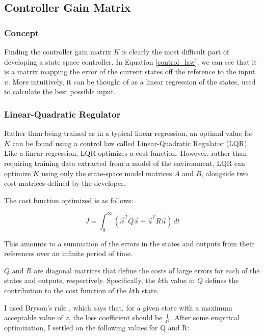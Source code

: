 \documentclass[11pt]{article}
\begin{document}
\subsection{Controller Gain Matrix}

\subsubsection{Concept}

Finding the controller gain matrix $K$ is clearly the most difficult part of developing a state space controller. In Equation \ref{control_law}, we can see that it is a matrix mapping the error of the current states off the reference to the input $u$. More intuitively, it can be thought of as a linear regression of the states, used to calculate the best possible input.

\subsubsection{Linear-Quadratic Regulator}

Rather than being trained as in a typical linear regression, an optimal value for $K$ can be found using a control law called Linear-Quadratic Regulator (LQR). Like a linear regression, LQR optimizes a cost function. However, rather than requiring training data extracted from a model of the environment, LQR can optimize $K$ using only the state-space model matrices $A$ and $B$, alongside two cost matrices defined by the developer.

The cost function optimized is as follows:

\begin{equation}
    J = \int _0 ^{\infty} \! (\vec{x} ^T Q \vec{x} + \vec{u} ^T R \vec{u}) \, dt
\end{equation}

This amounts to a summation of the errors in the states and outputs from their references over an infinite period of time.

$Q$ and $R$ are diagonal matrices that define the costs of large errors for each of the states and outputs, respectively. Specifically, the $k$th value in $Q$ defines the contribution to the cost function of the $k$th state.

I used Bryson's rule \cite{veness}, which says that, for a given state with a maximum acceptable value of $z$, the loss coefficient should be $\displaystyle \frac{1}{z ^2}$. After some empirical optimization, I settled on the following values for Q and R:
\end{document}
